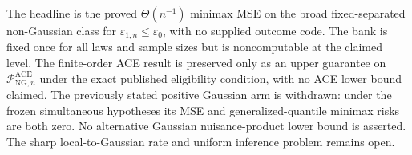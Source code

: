 The headline is the proved \(\Theta(n^{-1})\) minimax MSE on the broad fixed-separated non-Gaussian class for \(\varepsilon_{1,n}\le\varepsilon_0\), with no supplied outcome code.  The bank is fixed once for all laws and sample sizes but is noncomputable at the claimed level.  The finite-order ACE result is preserved only as an upper guarantee on \(\mathcal P_{\mathrm{NG},n}^{\mathrm{ACE}}\) under the exact published eligibility condition, with no ACE lower bound claimed.  The previously stated positive Gaussian arm is withdrawn: under the frozen simultaneous hypotheses its MSE and generalized-quantile minimax risks are both zero.  No alternative Gaussian nuisance-product lower bound is asserted.  The sharp local-to-Gaussian rate and uniform inference problem remains open.